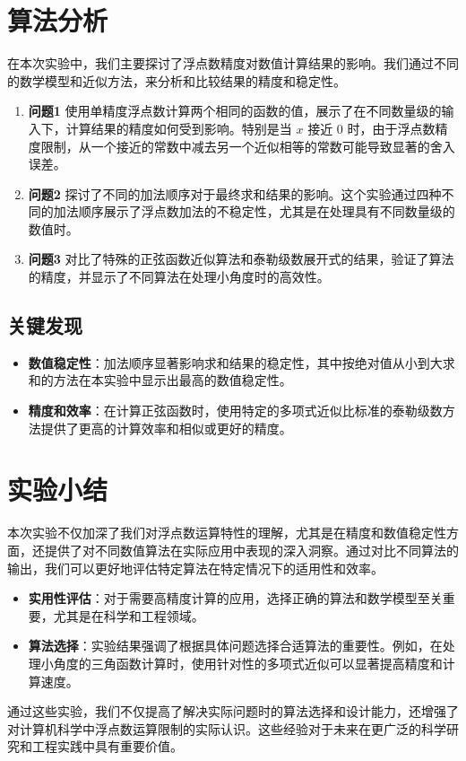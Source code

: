 \documentclass[UTF8]{ctexart}
\begin{document}
\begin{itemize}

\end{itemize}


\section{算法分析}

在本次实验中，我们主要探讨了浮点数精度对数值计算结果的影响。我们通过不同的数学模型和近似方法，来分析和比较结果的精度和稳定性。

\begin{enumerate}
    \item \textbf{问题1} 使用单精度浮点数计算两个相同的函数的值，展示了在不同数量级的输入下，计算结果的精度如何受到影响。特别是当 \(x\) 接近 0 时，由于浮点数精度限制，从一个接近的常数中减去另一个近似相等的常数可能导致显著的舍入误差。
    \item \textbf{问题2} 探讨了不同的加法顺序对于最终求和结果的影响。这个实验通过四种不同的加法顺序展示了浮点数加法的不稳定性，尤其是在处理具有不同数量级的数值时。
    \item \textbf{问题3} 对比了特殊的正弦函数近似算法和泰勒级数展开式的结果，验证了算法的精度，并显示了不同算法在处理小角度时的高效性。
\end{enumerate}

\subsection*{关键发现}
\begin{itemize}
    \item \textbf{数值稳定性}：加法顺序显著影响求和结果的稳定性，其中按绝对值从小到大求和的方法在本实验中显示出最高的数值稳定性。
    \item \textbf{精度和效率}：在计算正弦函数时，使用特定的多项式近似比标准的泰勒级数方法提供了更高的计算效率和相似或更好的精度。
\end{itemize}

\section{实验小结}

本次实验不仅加深了我们对浮点数运算特性的理解，尤其是在精度和数值稳定性方面，还提供了对不同数值算法在实际应用中表现的深入洞察。通过对比不同算法的输出，我们可以更好地评估特定算法在特定情况下的适用性和效率。

\begin{itemize}
    \item \textbf{实用性评估}：对于需要高精度计算的应用，选择正确的算法和数学模型至关重要，尤其是在科学和工程领域。
    \item \textbf{算法选择}：实验结果强调了根据具体问题选择合适算法的重要性。例如，在处理小角度的三角函数计算时，使用针对性的多项式近似可以显著提高精度和计算速度。
\end{itemize}

通过这些实验，我们不仅提高了解决实际问题时的算法选择和设计能力，还增强了对计算机科学中浮点数运算限制的实际认识。这些经验对于未来在更广泛的科学研究和工程实践中具有重要价值。
\end{document}
